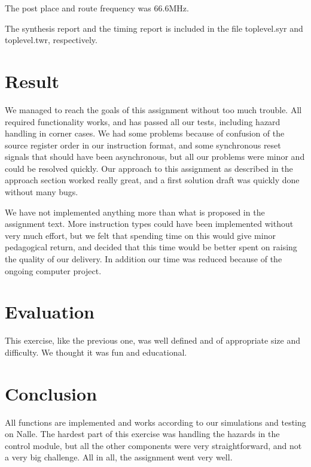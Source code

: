 \documentclass[11pt]{report}
\begin{document}
The post place and route frequency was 66.6MHz.

The synthesis report and the timing report is included in the file 
toplevel.syr and toplevel.twr, respectively.

\section*{Result}


We managed to reach the goals of this assignment without too much trouble.
All required functionality works, and has passed all our tests, including
hazard handling in corner cases. We had some problems because of confusion
of the source register order in our instruction format, and some synchronous
reset signals that should have been asynchronous, but all our problems were 
minor and could be resolved quickly. Our approach to this assignment as described
in the approach section worked really great, and a first solution draft was 
quickly done without many bugs. 

We have not implemented anything more than what is proposed in the assignment
text. More instruction types could have been implemented without very much effort,
but we felt that spending time on this would give minor pedagogical return, 
and decided that this time would be better spent on raising the quality of our
delivery. In addition our time was reduced because of the ongoing computer
project.


\section*{Evaluation}


This exercise, like the previous one, was well defined and of appropriate
size and difficulty. We thought it was fun and educational.

\section*{Conclusion}


All functions are implemented and works according to our simulations
and testing on Nalle.
The hardest part of this exercise was handling the hazards in the control
module, but all the other components were very straightforward, and
not a very big challenge. All in all, the assignment went very well.
\end{document}
